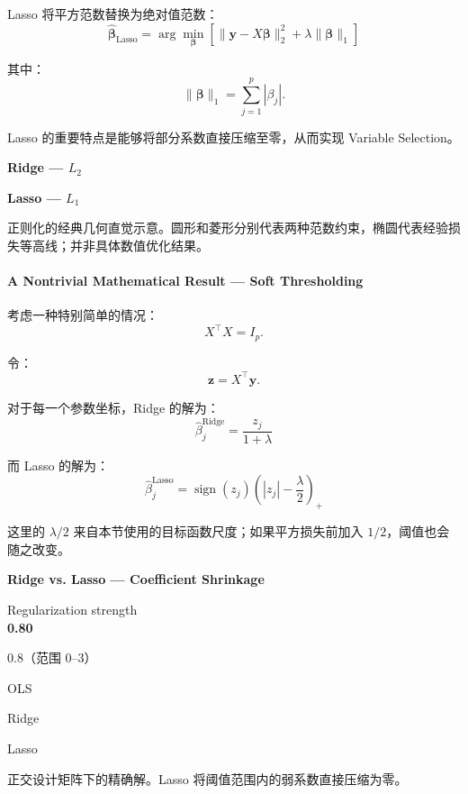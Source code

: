 Lasso 将平方范数替换为绝对值范数：
\[\boxed{
\hat{\boldsymbol\beta}_{\mathrm{Lasso}}
=
\arg\min_{\boldsymbol\beta}
\left[
\|\boldsymbol y-X\boldsymbol\beta\|_2^2
+
\lambda\|\boldsymbol\beta\|_1
\right]
}\]

其中：
\[\|\boldsymbol\beta\|_1
=
\sum_{j=1}^{p}|\beta_j|.\]

Lasso 的重要特点是能够将部分系数直接压缩至零，从而实现 Variable Selection。

\textbf{Ridge --- \(L_2\)}


\textbf{Lasso --- \(L_1\)}


正则化的经典几何直觉示意。圆形和菱形分别代表两种范数约束，椭圆代表经验损失等高线；并非具体数值优化结果。

\hypertarget{part-4-63-0001-a-nontrivial-mathematical-result-soft-thresholding}{%
\paragraph{A Nontrivial Mathematical Result --- Soft Thresholding}\label{part-4-63-0001-a-nontrivial-mathematical-result-soft-thresholding}}

考虑一种特别简单的情况：
\[X^\top X=I_p.\]

令：
\[\boldsymbol z=X^\top\boldsymbol y.\]

对于每一个参数坐标，Ridge 的解为：
\[\boxed{
\hat\beta_j^{\mathrm{Ridge}}
=
\frac{z_j}{1+\lambda}
}\]

而 Lasso 的解为：
\[\boxed{
\hat\beta_j^{\mathrm{Lasso}}
=
\operatorname{sign}(z_j)
\left(|z_j|-\frac{\lambda}{2}\right)_+
}\]

这里的 \(\lambda/2\) 来自本节使用的目标函数尺度；如果平方损失前加入 \(1/2\)，阈值也会随之改变。

\textbf{Ridge vs. Lasso --- Coefficient Shrinkage}

Regularization strength\\
\textbf{0.80}

0.8（范围 0--3）


OLS

Ridge

Lasso

正交设计矩阵下的精确解。Lasso 将阈值范围内的弱系数直接压缩为零。

